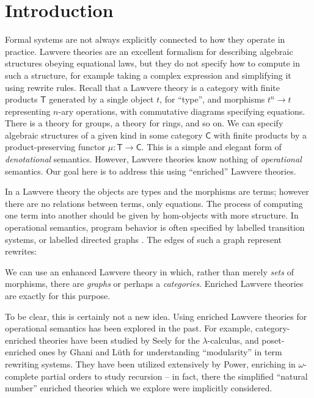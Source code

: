 \documentclass{amsart}
\theoremstyle{definition}
\newcommand{\C}{\mathsf{C}}
\newcommand{\T}{\mathsf{T}}
\newcommand{\maps}{\colon}
\begin{document}
\section{Introduction}

Formal systems are not always explicitly connected to how they operate in practice.   Lawvere theories  \cite{lawvere} are an excellent formalism for describing algebraic structures obeying equational laws, but they do not specify how to compute in such a structure, for example taking a complex expression and simplifying it using rewrite rules.   Recall that a Lawvere theory is a category with finite products $\T$ generated by a single object $t$, for ``type'', and morphisms $t^n \to t$ representing $n$-ary operations, with commutative diagrams specifying equations.   There is a theory for groups, a theory for rings, and so on.   We can specify algebraic structures of a given kind in some category $\C$ with finite products by a product-preserving functor $\mu \maps\T \to \C$.   This is a simple and elegant form of \emph{denotational} semantics.    However, Lawvere theories know nothing of \emph{operational} semantics.  Our goal here is to address this using ``enriched'' Lawvere theories.

In a Lawvere theory the objects are types and the morphisms are terms; however there are no relations between terms, only equations. The process of computing one term into another should be given by hom-objects with more structure.  In operational semantics, program behavior is often specified by labelled transition systems, or labelled directed graphs \cite{sos}.  The edges of such a graph represent rewrites:
\begin{center}\end{center}
We can use an enhanced Lawvere theory in which, rather than merely \emph{sets} of morphisms, there are \emph{graphs} or perhaps a \emph{categories}. Enriched Lawvere theories are exactly for this purpose.

To be clear, this is certainly not a new idea. Using enriched Lawvere theories for operational semantics has been explored in the past. For example, category-enriched theories have been studied by Seely \cite{seely} for the $\lambda$-calculus, and poset-enriched ones by Ghani and L\"uth \cite{ghani} for understanding ``modularity'' in term rewriting systems.  They have been utilized extensively by Power, enriching in $\omega$-complete partial orders to study recursion \cite{compeffects} -- in fact, there the simplified ``natural number'' enriched theories which we explore were implicitly considered.
\end{document}
